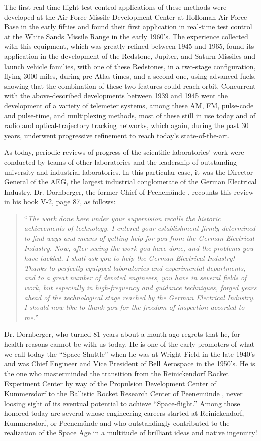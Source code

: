 \documentclass[11pt, a4paper]{article}
\begin{document}
The first real-time flight test control applications of these methods were developed at the Air Force Missile Development Center at Holloman Air Force Base in the early fifties and found their first application in real-time test control at the White Sands Missile Range in the early 1960's. The experience collected with this equipment, which was greatly refined between 1945 and 1965, found its application in the development of the Redstone, Jupiter, and Saturn Missiles and launch vehicle families, with one of these Redstones, in a two-stage configuration, flying 3000 miles, during pre-Atlas times, and a second one, using advanced fuels, showing that the combination of these two features could reach orbit. Concurrent with the above-described developments between 1939 and 1945 went the development of a variety of telemeter systems, among these AM, FM, pulse-code and pulse-time, and multiplexing methods, most of these still in use today and of radio and optical-trajectory tracking networks, which again, during the past 30 years, underwent progressive refinement to reach today's state-of-the-art.

As today, periodic reviews of progress of the scientific laboratories' work were conducted by teams of other laboratories and the leadership of outstanding university and industrial laboratories. In this particular case, it was the Director-General of the AEG, the largest industrial conglomerate of the German Electrical Industry. Dr. Dornberger, the former Chief of Peenemünde , recounts this review in his book V-2, page 87, as follows:

\begin{quote}
  ``\textit{The work done here under your supervision recalls the historic achievements of technology. I entered your establishment firmly determined to find ways and means of getting help for you from the German Electrical Industry. Now, after seeing the work you have done, and the problems you have tackled, I shall ask you to help the German Electrical Industry! Thanks to perfectly equipped laboratories and experimental departments, and to a great number of devoted engineers, you have in several fields of work, but especially in high-frequency and guidance techniques, forged years ahead of the technological stage reached by the German Electrical Industry. I should now like to thank you for the freedom of inspection accorded to me.}''
\end{quote}

Dr. Dornberger, who turned 81 years about a month ago regrets that he, for health reasons cannot be with us today. He is one of the early promoters of what we call today the ``Space Shuttle'' when he was at Wright Field in the late 1940's and was Chief Engineer and Vice President of Bell Aerospace in the 1950's. He is the one who masterminded the transition from the Reinickendorf Rocket Experiment Center by way of the Propulsion Development Center of Kummersdorf to the Ballistic Rocket Research Center of Peenemünde , never loosing sight of its eventual potential to achieve ``Space-flight.'' Among those honored today are several whose engineering careers started at Reinickendorf, Kummersdorf, or Peenemünde  and who outstandingly contributed to the realization of the Space Age in a multitude of brilliant ideas and native ingenuity!
\end{document}
